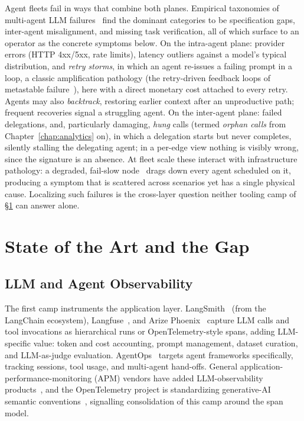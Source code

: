 Agent fleets fail in ways that combine both planes. Empirical taxonomies of
multi-agent LLM failures~\cite{cemri2025mast} find the dominant categories
to be specification gaps, inter-agent misalignment, and missing task
verification, all of which surface to an operator as the concrete symptoms
below. On the intra-agent plane:
provider errors (HTTP 4xx/5xx, rate limits), latency outliers against a
model's typical distribution, and \emph{retry storms}, in which an agent
re-issues a failing prompt in a loop, a classic amplification pathology
(the retry-driven feedback loops of metastable
failure~\cite{bronson2021metastable}), here with a direct monetary cost
attached to every retry. Agents may
also \emph{backtrack}, restoring earlier context after an unproductive path;
frequent recoveries signal a struggling agent. On the inter-agent plane:
failed delegations, and, particularly damaging, \emph{hung} calls
(termed \emph{orphan calls} from Chapter~\ref{chap:analytics} on), in
which a delegation starts but never completes, silently stalling the
delegating agent; in a per-edge view nothing is visibly wrong, since the
signature is an absence. At fleet scale these interact with infrastructure
pathology: a degraded, fail-slow node~\cite{gunawi2018failslow} drags down
every agent scheduled on it, producing a symptom that is scattered across
scenarios yet has a single physical cause. Localizing such failures is
the cross-layer question neither tooling camp of
\S\ref{sec:bg-sota} can answer alone.

\section{State of the Art and the Gap}
\label{sec:bg-sota}

\subsection{LLM and Agent Observability}
\label{sec:bg-sota-llm}

The first camp instruments the application layer.
LangSmith~\cite{langsmith} (from the LangChain ecosystem),
Langfuse~\cite{langfuse}, and Arize Phoenix~\cite{phoenix} capture LLM calls
and tool invocations as hierarchical runs or OpenTelemetry-style spans,
adding LLM-specific value: token and cost accounting, prompt management,
dataset curation, and LLM-as-judge evaluation. AgentOps~\cite{agentops}
targets agent frameworks specifically, tracking sessions, tool usage, and
multi-agent hand-offs. General application-performance-monitoring (APM)
vendors have added LLM-observability products~\cite{datadogllm}, and the
OpenTelemetry project is standardizing generative-AI semantic
conventions~\cite{otelgenai}, signalling consolidation of this camp around
the span model.

